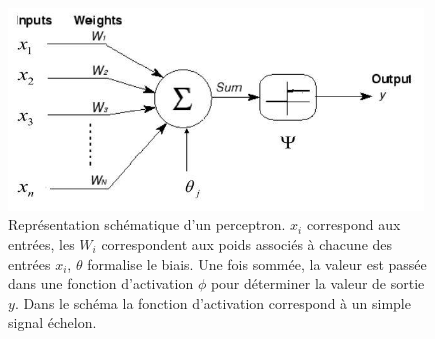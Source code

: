 \begin{figure}[h]
  \centering
  \includegraphics[width=11cm]{./Chapitre2/figures/perceptron.png}
  \caption{Représentation schématique d'un perceptron. $x_i$ correspond aux entrées, les $W_i$ correspondent aux poids associés à chacune des entrées $x_i$, $\theta$ formalise le biais. Une fois sommée, la valeur est passée dans une fonction d'activation $\phi$ pour déterminer la valeur de sortie $y$. Dans le schéma la fonction d'activation correspond à un simple signal échelon.}
  \label{fig:perceptron}
\end{figure}
